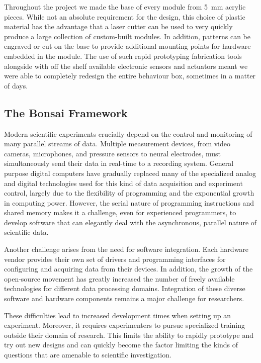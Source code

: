 Throughout the project we made the base of every module from \SI{5}{\milli\meter} acrylic pieces. While not an absolute requirement for the design, this choice of plastic material has the advantage that a laser cutter can be used to very quickly produce a large collection of custom-built modules. In addition, patterns can be engraved or cut on the base to provide additional mounting points for hardware embedded in the module. The use of such rapid prototyping fabrication tools alongside with off the shelf available electronic sensors and actuators meant we were able to completely redesign the entire behaviour box, sometimes in a matter of days.

\subsection{The Bonsai Framework}

Modern scientific experiments crucially depend on the control and monitoring of many parallel streams of data. Multiple measurement devices, from video cameras, microphones, and pressure sensors to neural electrodes, must simultaneously send their data in real-time to a recording system. General purpose digital computers have gradually replaced many of the specialized analog and digital technologies used for this kind of data acquisition and experiment control, largely due to the flexibility of programming and the exponential growth in computing power. However, the serial nature of programming instructions and shared memory makes it a challenge, even for experienced programmers, to develop software that can elegantly deal with the asynchronous, parallel nature of scientific data.

Another challenge arises from the need for software integration. Each hardware vendor provides their own set of drivers and programming interfaces for configuring and acquiring data from their devices. In addition, the growth of the open-source movement has greatly increased the number of freely available technologies for different data processing domains. Integration of these diverse software and hardware components remains a major challenge for researchers.

These difficulties lead to increased development times when setting up an experiment. Moreover, it requires experimenters to pursue specialized training outside their domain of research. This limits the ability to rapidly prototype and try out new designs and can quickly become the factor limiting the kinds of questions that are amenable to scientific investigation.

